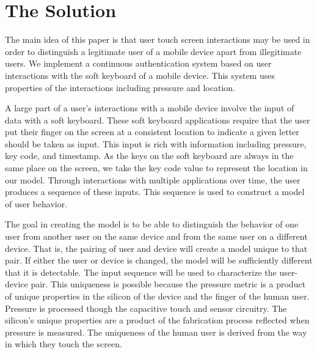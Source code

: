 \section{The Solution}
\label{the_solution}
The main idea of this paper is that user
%
touch screen interactions may be used in order to
distinguish a legitimate user of a mobile device apart from
illegitimate users.
%
We implement a continuous authentication system
based on user interactions with the soft keyboard of
a mobile device.
This system uses properties of the interactions including
pressure and location.

A large part of a user's interactions with a mobile
device involve the input of data with a soft keyboard.
These soft keyboard applications require that
the user put their finger on the screen at a consistent
location to indicate a given letter should be taken as input.
This input is rich with information including
pressure,
key code, and
timestamp.
As the keys on the soft keyboard are always in the same place on the screen,
we take the key code value to represent the location in our model.
Through interactions with multiple applications over time,
the user produces a sequence of these inputs.
This sequence is used to construct a model of user behavior.

The goal in creating the model
is to be able to distinguish the behavior
of one user from 
another user on the same device and
from the same user on a different device.
That is, the pairing of user and device will
create a model unique to that pair.
If either the user or device is changed,
the model will be sufficiently different
that it is detectable.
The input sequence will be used to characterize the user-device pair.
This uniqueness is possible because
the pressure metric is a product of 
unique properties in
the silicon of the device and
the finger of the human user.
%
Pressure is processed though the capacitive touch and sensor circuitry.
The silicon's unique properties
are a product of the fabrication process %
reflected when pressure is measured.
The uniqueness of the human user is derived from
the way in which they touch the screen.

